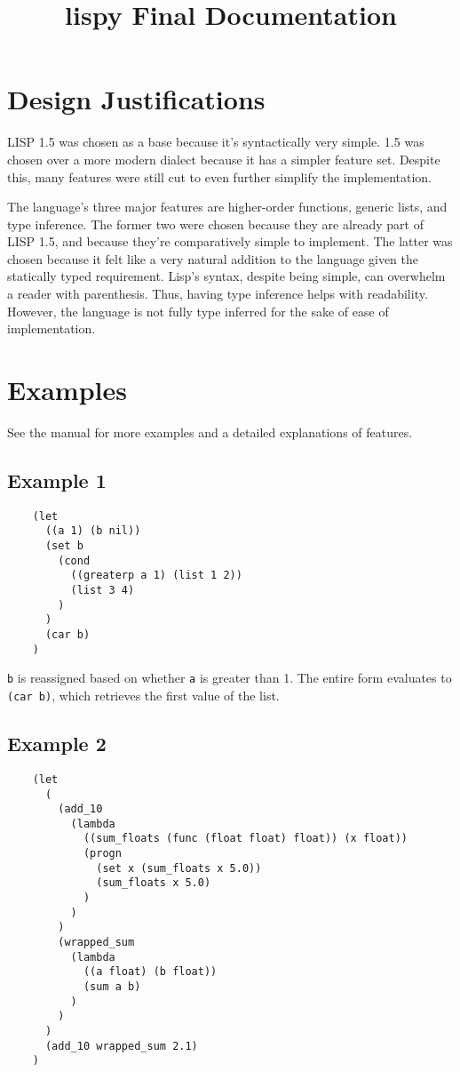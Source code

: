 \documentclass[a4paper, 12pt]{article}
\title{lispy Final Documentation}
\begin{document}
\maketitle
{
\hypersetup{linkcolor=black}
\tableofcontents
}

\newpage
\section{Design Justifications}
LISP 1.5 was chosen as a base because it's syntactically very simple. 1.5 was chosen over a more modern dialect because it has a simpler feature set. Despite this, many features were still cut to even further simplify the implementation.

The language's three major features are higher-order functions, generic lists, and type inference. The former two were chosen because they are already part of LISP 1.5, and because they're comparatively simple to implement. The latter was chosen because it felt like a very natural addition to the language given the statically typed requirement. Lisp's syntax, despite being simple, can overwhelm a reader with parenthesis. Thus, having type inference helps with readability. However, the language is not fully type inferred for the sake of ease of implementation.

\section{Examples}
See the manual for more examples and a detailed explanations of features.

\subsection{Example 1}
\begin{verbatim}
    (let
      ((a 1) (b nil))
      (set b
        (cond
          ((greaterp a 1) (list 1 2))
          (list 3 4)
        )
      )
      (car b)
    )
\end{verbatim}

\texttt{b} is reassigned based on whether \texttt{a} is greater than 1. The entire form evaluates to \texttt{(car b)}, which retrieves the first value of the list.


\subsection{Example 2}
\begin{verbatim}
    (let
      (
        (add_10
          (lambda
            ((sum_floats (func (float float) float)) (x float))
            (progn
              (set x (sum_floats x 5.0))
              (sum_floats x 5.0)
            )
          )
        )
        (wrapped_sum
          (lambda
            ((a float) (b float))
            (sum a b)
          )
        )
      )
      (add_10 wrapped_sum 2.1)
    )
\end{verbatim}
\end{document}

